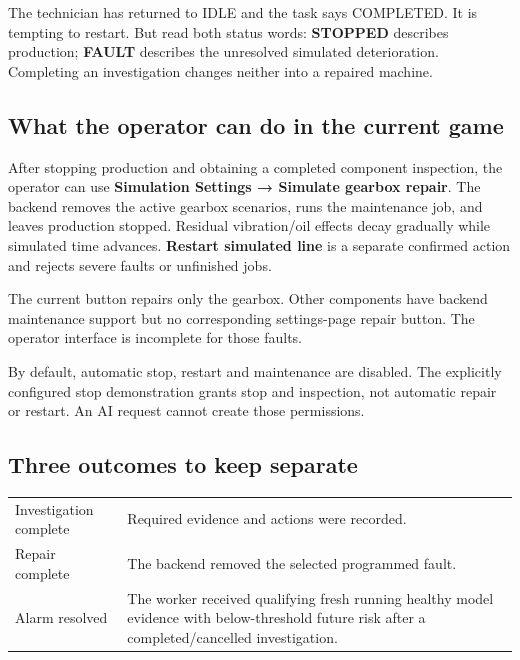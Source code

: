 The technician has returned to IDLE and the task says COMPLETED. It is tempting to restart. But read both status words: \textbf{STOPPED} describes production; \textbf{FAULT} describes the unresolved simulated deterioration. Completing an investigation changes neither into a repaired machine.

\subsection*{What the operator can do in the current game}
After stopping production and obtaining a completed component inspection, the operator can use \textbf{Simulation Settings → Simulate gearbox repair}. The backend removes the active gearbox scenarios, runs the maintenance job, and leaves production stopped. Residual vibration/oil effects decay gradually while simulated time advances. \textbf{Restart simulated line} is a separate confirmed action and rejects severe faults or unfinished jobs.

The current button repairs only the gearbox. Other components have backend maintenance support but no corresponding settings-page repair button. The operator interface is incomplete for those faults.

By default, automatic stop, restart and maintenance are disabled. The explicitly configured stop demonstration grants stop and inspection, not automatic repair or restart. An AI request cannot create those permissions.

\subsection*{Three outcomes to keep separate}
\begin{tabularx}{\linewidth}{@{}p{.24\linewidth}X@{}}\toprule
Investigation complete & Required evidence and actions were recorded.\\
Repair complete & The backend removed the selected programmed fault.\\
Alarm resolved & The worker received qualifying fresh running healthy model evidence with below-threshold future risk after a completed/cancelled investigation.\\\bottomrule
\end{tabularx}

